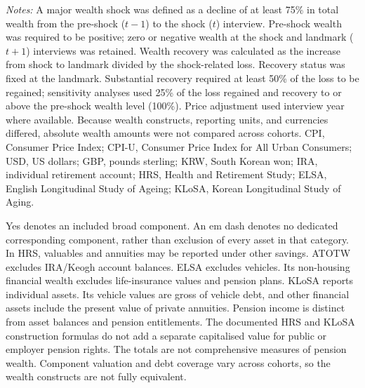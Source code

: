 \begin{landscape}
\vspace{0.18em}
\parbox{\linewidth}{\raggedright\fontsize{9}{11}\selectfont\textit{Notes:} A major wealth shock was defined as a decline of at least 75\% in total wealth from the pre-shock ($t-1$) to the shock ($t$) interview. Pre-shock wealth was required to be positive; zero or negative wealth at the shock and landmark ($t+1$) interviews was retained. Wealth recovery was calculated as the increase from shock to landmark divided by the shock-related loss. Recovery status was fixed at the landmark. Substantial recovery required at least 50\% of the loss to be regained; sensitivity analyses used 25\% of the loss regained and recovery to or above the pre-shock wealth level (100\%). Price adjustment used interview year where available. Because wealth constructs, reporting units, and currencies differed, absolute wealth amounts were not compared across cohorts. CPI, Consumer Price Index; CPI-U, Consumer Price Index for All Urban Consumers; USD, US dollars; GBP, pounds sterling; KRW, South Korean won; IRA, individual retirement account; HRS, Health and Retirement Study; ELSA, English Longitudinal Study of Ageing; KLoSA, Korean Longitudinal Study of Aging.}
\par\vspace{0.3em}
\parbox{\linewidth}{\raggedright\fontsize{9}{11}\selectfont Yes denotes an included broad component. An em dash denotes no dedicated corresponding component, rather than exclusion of every asset in that category. In HRS, valuables and annuities may be reported under other savings. ATOTW excludes IRA/Keogh account balances. ELSA excludes vehicles. Its non-housing financial wealth excludes life-insurance values and pension plans. KLoSA reports individual assets. Its vehicle values are gross of vehicle debt, and other financial assets include the present value of private annuities. Pension income is distinct from asset balances and pension entitlements. The documented HRS and KLoSA construction formulas do not add a separate capitalised value for public or employer pension rights. The totals are not comprehensive measures of pension wealth. Component valuation and debt coverage vary across cohorts, so the wealth constructs are not fully equivalent.}
\end{landscape}
